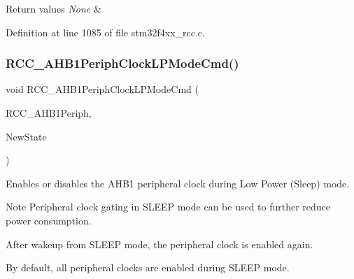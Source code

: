 \begin{DoxyRetVals}{Return values}
{\em None} & \\
\hline
\end{DoxyRetVals}


Definition at line 1085 of file stm32f4xx\+\_\+rcc.\+c.

\mbox{\label{group___r_c_c___group3_ga5cd0d5adbc7496d7005b208bd19ce255}} 
\subsubsection{\texorpdfstring{R\+C\+C\+\_\+\+A\+H\+B1\+Periph\+Clock\+L\+P\+Mode\+Cmd()}{RCC\_AHB1PeriphClockLPModeCmd()}}
{\footnotesize\ttfamily void R\+C\+C\+\_\+\+A\+H\+B1\+Periph\+Clock\+L\+P\+Mode\+Cmd (\begin{DoxyParamCaption}\item[{uint32\+\_\+t}]{R\+C\+C\+\_\+\+A\+H\+B1\+Periph,  }\item[{Functional\+State}]{New\+State }\end{DoxyParamCaption})}



Enables or disables the A\+H\+B1 peripheral clock during Low Power (Sleep) mode. 

\begin{DoxyNote}{Note}
Peripheral clock gating in S\+L\+E\+EP mode can be used to further reduce power consumption. 

After wakeup from S\+L\+E\+EP mode, the peripheral clock is enabled again. 

By default, all peripheral clocks are enabled during S\+L\+E\+EP mode. 
\end{DoxyNote}

